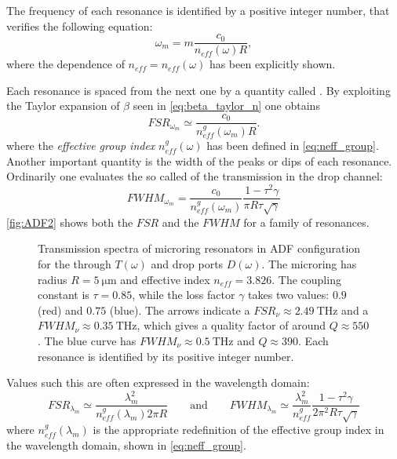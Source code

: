 The frequency of each resonance is identified by a positive integer number, that verifies the following equation:
\begin{equation}
	\omega_m = m\dfrac{c_0}{n_{eff}(\omega)R},
\end{equation}
where the dependence of $n_{eff}=n_{eff}\left(\omega\right)$ has been explicitly shown.

Each resonance is spaced from the next one by a quantity called .
By exploiting the Taylor expansion of $\beta$ seen in \cref{eq:beta_taylor_n} one obtains
\begin{equation}
	FSR_{\omega_m} \simeq \dfrac{c_0}{n_{eff}^g\left(\omega_m\right) R} .
\end{equation}
where the \textit{effective group index} $n_{eff}^g\left(\omega\right)$ has been defined in \cref{eq:neff_group}.
Another important quantity is the width of the peaks or dips of each resonance.
Ordinarily one evaluates the so called  of the transmission in the drop channel:
\begin{equation}
	FWHM_{\omega_m} = \dfrac{c_0}{n_{eff}^g\left(\omega_m\right)}\dfrac{1- \tau^2\gamma}{\pi R \tau \sqrt{\gamma}}
\end{equation}
\autoref{fig:ADF2} shows both the $FSR$ and the $FWHM$ for a family of resonances.

\begin{figure}[htbp]
	\centering
	
	\caption{
		Transmission spectra of microring resonators in \ac{ADF} configuration for the through $T(\omega)$ and drop ports $D(\omega)$.
		The microring has radius $R=\SI{5}{\um}$ and effective index $n_{eff}=3.826$.
		The coupling constant is $\tau=0.85$, while the loss factor $\gamma$ takes two values: $0.9$ (red) and $0.75$ (blue).
		The arrows indicate a $FSR_\nu \approx \SI{2.49}{\THz}$ and a $FWHM_\nu \approx \SI{0.35}{\THz}$, which gives a quality factor of around $Q \approx \num{550}$.
		The blue curve has $FWHM_\nu \approx \SI{0.5}{\THz}$ and $Q \approx \num{390}$.
		Each resonance is identified by its positive integer number.
	}
	\label{fig:ADF2}
\end{figure}

Values such this are often expressed in the wavelength domain:
\begin{equation}
	FSR_{\lambda_m} \simeq \dfrac{\lambda_m^2}{n_{eff}^g\left(\lambda_m\right) 2\pi R}
		\qquad \mathrm{and} \qquad
	FWHM_{\lambda_m} \simeq	\dfrac{\lambda_m^2}{n_{eff}^g}
													\dfrac{1- \tau^2\gamma}{2\pi^2 R \tau \sqrt{\gamma}}
\end{equation}
where $n_{eff}^g\left(\lambda_m\right)$ is the appropriate redefinition of the effective group index in the wavelength domain, shown in \cref{eq:neff_group}.

